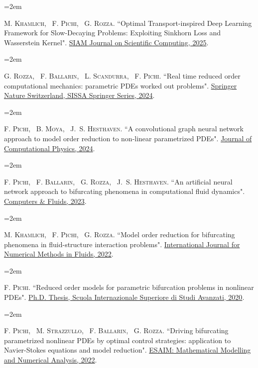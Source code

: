 \documentclass[
  usegeometry%
]{scrartcl}
\newcommand{\MarginText}[1]{\marginpar{\raggedleft\itshape\small#1}} %
\newcommand{\Description}[1]{\hangindent=2em\hangafter=0\noindent\raggedright\footnotesize{#1}\par\normalsize\vspace{1em}} %
\begin{document}
\begin{cv}{}
\Description{\MarginText{[10]}M. \textsc{Khamlich}, ~F. \textsc{Pichi}, ~G. \textsc{Rozza.} {\color{blue} ``Optimal Transport-inspired Deep Learning Framework for Slow-Decaying Problems: Exploiting Sinkhorn Loss and Wasserstein Kernel".} \href{https://epubs.siam.org/doi/10.1137/23M1604680}{SIAM Journal on Scientific Computing, 2025}.}

\newpage
\Description{\MarginText{[9]}G. \textsc{Rozza}, ~F. \textsc{Ballarin}, ~L. \textsc{Scandurra}, ~F. \textsc{Pichi.} {\color{blue} ``Real time reduced order computational mechanics: parametric PDEs worked out problems".} \href{https://doi.org/10.1007/978-3-031-49892-3}{Springer Nature Switzerland, SISSA Springer Series, 2024}.}

\Description{\MarginText{[8]}F. \textsc{Pichi}, ~B. \textsc{Moya}, ~J.~S. \textsc{Hesthaven.} {\color{blue} ``A convolutional graph neural network approach to model order reduction to non-linear parametrized PDEs".} \href{https://www.sciencedirect.com/science/article/pii/S0021999124000111}{Journal of Computational Physics, 2024}.}

\Description{\MarginText{[7]}F. \textsc{Pichi}, ~F. \textsc{Ballarin}, ~G. \textsc{Rozza}, ~J.~S. \textsc{Hesthaven.} {\color{blue} ``An artificial neural network approach to bifurcating phenomena in computational fluid dynamics".} \href{https://doi.org/10.1016/j.compfluid.2023.105813}{Computers \& Fluids, 2023}.}


\Description{\MarginText{[6]}M. \textsc{Khamlich}, ~F. \textsc{Pichi}, ~G. \textsc{Rozza.} {\color{blue} ``Model order reduction for bifurcating phenomena in fluid-structure interaction problems".} \href{https://onlinelibrary.wiley.com/doi/abs/10.1002/fld.5118}{International Journal for Numerical Methods in Fluids, 2022}.}


\Description{\MarginText{[5]}F. \textsc{Pichi.} {\color{blue} ``Reduced order models for parametric bifurcation
problems in nonlinear {PDE}s".} \href{https://iris.sissa.it/handle/20.500.11767/114329}{Ph.D. Thesis, Scuola Internazionale Superiore di Studi Avanzati, 2020}.}



\Description{\MarginText{[4]}F. \textsc{Pichi}, ~M. \textsc{Strazzullo}, ~F. \textsc{Ballarin}, ~G. \textsc{Rozza.} {\color{blue} ``Driving bifurcating parametrized nonlinear PDEs by optimal control strategies: application to Navier-Stokes equations and model reduction".} \href{https://www.esaim-m2an.org/articles/m2an/abs/2022/04/m2an200206/m2an200206.html}{ESAIM: Mathematical Modelling and Numerical Analysis, 2022}.}



\end{cv}
\end{document}
